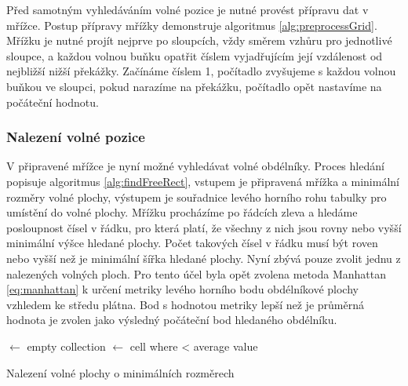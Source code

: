 \documentclass[czech,bachelor,public,dept460,male,oneside]{diploma}
\begin{document}
	Před samotným vyhledáváním volné pozice je nutné provést přípravu dat v mřížce. Postup přípravy mřížky demonstruje algoritmus \ref{alg:preprocessGrid}. Mřížku je nutné projít nejprve po sloupcích, vždy směrem vzhůru pro jednotlivé sloupce, a každou volnou buňku opatřit číslem vyjadřujícím její vzdálenost od nejbližší nižší překážky. Začínáme číslem 1, počítadlo zvyšujeme s každou volnou buňkou ve sloupci, pokud narazíme na překážku, počítadlo opět nastavíme na počáteční hodnotu. 
	
	\subsubsection{Nalezení volné pozice}
	V připravené mřížce je nyní možné vyhledávat volné obdélníky. Proces hledání popisuje algoritmus \ref{alg:findFreeRect}, vstupem je připravená mřížka a minimální rozměry volné plochy, výstupem je souřadnice levého horního rohu tabulky pro umístění do volné plochy. Mřížku procházíme po řádcích zleva a hledáme posloupnost čísel v řádku, pro která platí, že všechny z nich jsou rovny nebo vyšší minimální výšce hledané plochy. Počet takových čísel v řádku musí být roven nebo vyšší než je minimální šířka hledané plochy. Nyní zbývá pouze zvolit jednu z nalezených volných ploch. Pro tento účel byla opět zvolena metoda Manhattan \ref{eq:manhattan} k určení metriky levého horního bodu obdélníkové plochy vzhledem ke středu plátna. Bod s hodnotou metriky lepší než je průměrná hodnota je zvolen jako výsledný počáteční bod hledaného obdélníku. 
	
		\begin{algorithm}[!h]
		
		
		
		\BlankLine
		
		\Nodes $\leftarrow$ empty collection\;
		\Result $\leftarrow$ cell where  < average value\;
		\caption{Nalezení volné plochy o minimálních rozměrech}
		\label{alg:findFreeRect}
	\end{algorithm}
\end{document}
